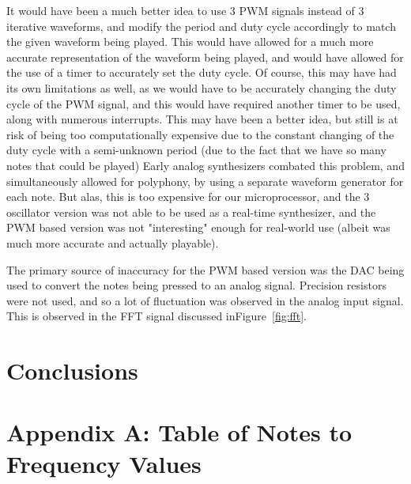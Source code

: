 \documentclass[10pt]{article}
\begin{document}
It would have been a much better idea to use 3 PWM signals instead of 3 iterative waveforms, and modify the period and duty cycle accordingly to match the given waveform being played.
This would have allowed for a much more accurate representation of the waveform being played, and would have allowed for the use of a timer to accurately set the duty cycle.
Of course, this may have had its own limitations as well, as we would have to be accurately changing the duty cycle of the PWM signal, and this would have required another timer to be used, along with numerous interrupts.
This may have been a better idea, but still is at risk of being too computationally expensive due to the constant changing of the duty cycle with a semi-unknown period (due to the fact that we have so many notes that could be played)
Early analog synthesizers combated this problem, and simultaneously allowed for polyphony, by using a separate waveform generator for each note.
But alas, this is too expensive for our microprocessor, and the 3 oscillator version was not able to be used as a real-time synthesizer, and the PWM based version was not "interesting" enough for real-world use (albeit was much more accurate and actually playable).

The primary source of inaccuracy for the PWM based version was the DAC being used to convert the notes being pressed to an analog signal.
Precision resistors were not used, and so a lot of fluctuation was observed in the analog input signal.
This is observed in the FFT signal discussed inFigure~\ref{fig:fft}.

\section{Conclusions}\label{sec:conclusions}





\appendix

\section{Appendix A: Table of Notes to Frequency Values}\label{sec:-table-of-notes-to-frequency-values}
\end{document}
